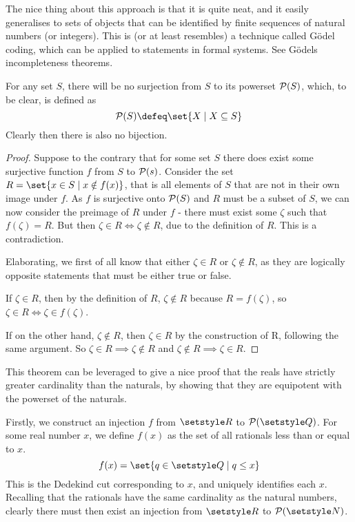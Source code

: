 The nice thing about this approach is that it is quite neat, and it easily
generalises to sets of objects that can be identified by finite sequences of
natural numbers (or integers). This is (or at least resembles) a technique
called G\"odel coding, which can be applied to statements in formal systems. See
G\"odels incompleteness theorems.

\begin{theorem}
 For any set \(S\), there will be no surjection from \(S\) to its powerset
 \(\operatorname{\mathcal P}(S)\), which, to be clear, is defined as
 \begin{equation*}
  \PowerSet(S) \defeq \set{X \mid X \subseteq S}
 \end{equation*}
 Clearly then there is also no bijection.
\end{theorem}
\begin{proof}
 Suppose to the contrary that for some set \(S\) there does exist some
 surjective function \(f\) from \(S\) to \(\operatorname{\mathcal P}(s)\). Consider the set
 \(R = \set{x \in S \mid x \notin f(x)}\), that is all elements of \(S\) that
 are not in their own image under \(f\). As \(f\) is surjective onto
 \(\operatorname{\mathcal P}(S)\) and \(R\) must be a subset of \(S\), we can now consider the
 preimage of \(R\) under \(f\) - there must exist some \(\zeta\) such that
 \(f(\zeta) = R\). But then \(\zeta \in R \iff \zeta \notin R\), due to the
 definition of \(R\). This is a contradiction.

 Elaborating, we first of all know that either \(\zeta \in R\) or
 \(\zeta \notin R\), as they are logically opposite statements that must be
 either true or false.

 If \(\zeta \in R\), then by the definition of \(R\),
 \(\zeta \notin R\) because \(R = f(\zeta)\), so
 \(\zeta \in R \iff \zeta \in f(\zeta)\).

 If on the other hand, \(\zeta \notin R\), then \(\zeta \in R\) by the
 construction of R, following the same argument. So
 \(\zeta \in R \implies \zeta \notin R\) and
 \(\zeta \notin R \implies \zeta \in R\).
\end{proof}

This theorem can be leveraged to give a nice proof that the reals have strictly
greater cardinality than the naturals, by showing that they are equipotent with
the powerset of the naturals.

Firstly, we construct an injection \(f\) from \(\Reals\) to
\(\PowerSet(\Rationals)\). For some real number \(x\), we define \(f(x)\) as the
set of all rationals less than or equal to \(x\).
\begin{equation*}
 f(x) = \set{q \in \Rationals \mid q \le x}
\end{equation*}
This is the Dedekind cut corresponding to \(x\), and uniquely identifies each
\(x\). Recalling that the rationals have the same cardinality as the natural
numbers, clearly there must then exist an injection from \(\Reals\) to
\(\PowerSet(\Naturals)\).

